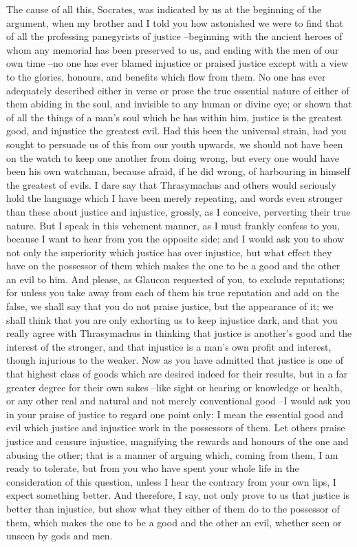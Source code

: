 The cause of all this, Socrates, was indicated by us at the beginning of the argument, when my brother and I told you how astonished we were to find that of all the professing panegyrists of justice --beginning with the ancient heroes of whom any memorial has been preserved to us, and ending with the men of our own time --no one has ever blamed injustice or praised justice except with a view to the glories, honours, and benefits which flow from them. No one has ever adequately described either in verse or prose the true essential nature of either of them abiding in the soul, and invisible to any human or divine eye; or shown that of all the things of a man's soul which he has within him, justice is the greatest good, and injustice the greatest evil. Had this been the universal strain, had you sought to persuade us of this from our youth upwards, we should not have been on the watch to keep one another from doing wrong, but every one would have been his own watchman, because afraid, if he did wrong, of harbouring in himself the greatest of evils. I dare say that Thrasymachus and others would seriously hold the language which I have been merely repeating, and words even stronger than these about justice and injustice, grossly, as I conceive, perverting their true nature. But I speak in this vehement manner, as I must frankly confess to you, because I want to hear from you the opposite side; and I would ask you to show not only the superiority which justice has over injustice, but what effect they have on the possessor of them which makes the one to be a good and the other an evil to him. And please, as Glaucon requested of you, to exclude reputations; for unless you take away from each of them his true reputation and add on the false, we shall say that you do not praise justice, but the appearance of it; we shall think that you are only exhorting us to keep injustice dark, and that you really agree with Thrasymachus in thinking that justice is another's good and the interest of the stronger, and that injustice is a man's own profit and interest, though injurious to the weaker. Now as you have admitted that justice is one of that highest class of goods which are desired indeed for their results, but in a far greater degree for their own sakes --like sight or hearing or knowledge or health, or any other real and natural and not merely conventional good --I would ask you in your praise of justice to regard one point only: I mean the essential good and evil which justice and injustice work in the possessors of them. Let others praise justice and censure injustice, magnifying the rewards and honours of the one and abusing the other; that is a manner of arguing which, coming from them, I am ready to tolerate, but from you who have spent your whole life in the consideration of this question, unless I hear the contrary from your own lips, I expect something better. And therefore, I say, not only prove to us that justice is better than injustice, but show what they either of them do to the possessor of them, which makes the one to be a good and the other an evil, whether seen or unseen by gods and men.

